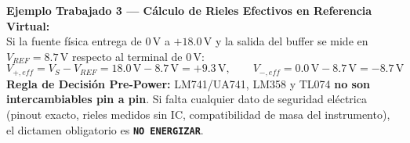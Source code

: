 \documentclass[10pt, a4paper]{article}
\begin{document}
\textbf{Ejemplo Trabajado 3 — Cálculo de Rieles Efectivos en Referencia Virtual:} \\
Si la fuente física entrega de $0\,\text{V}$ a $+18.0\,\text{V}$ y la salida del buffer se mide en $V_{REF} = 8.7\,\text{V}$ respecto al terminal de $0\,\text{V}$:
\begin{equation}
    V_{+,eff} = V_S - V_{REF} = 18.0\,\text{V} - 8.7\,\text{V} = \boxed{+9.3\,\text{V}}, \qquad V_{-,eff} = 0.0\,\text{V} - 8.7\,\text{V} = \boxed{-8.7\,\text{V}}
\end{equation}
\textbf{Regla de Decisión Pre-Power:} LM741/UA741, LM358 y TL074 \textbf{no son intercambiables pin a pin}. Si falta cualquier dato de seguridad eléctrica (pinout exacto, rieles medidos sin IC, compatibilidad de masa del instrumento), el dictamen obligatorio es \textbf{\texttt{NO ENERGIZAR}}.
\end{document}
